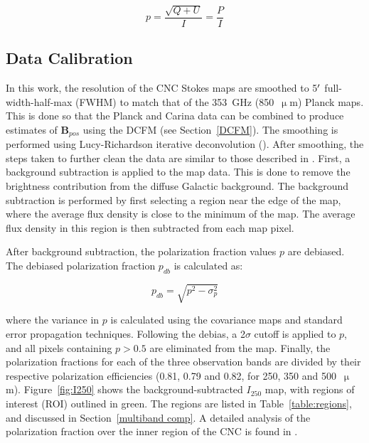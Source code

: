\begin{equation}\label{pol frac}
  p = \frac{\sqrt{Q + U}}{I} = \frac{P}{I}
\end{equation}

\subsection{Data Calibration}\label{data_cal}

In this work, the resolution of the CNC Stokes maps are smoothed to 5$\operatorname{^{\prime}}$ full-width-half-max (FWHM) to match that of the 353~GHz (850~$\upmu$m) Planck maps. This is done so that the Planck and Carina data can be combined to produce estimates of $\boldsymbol{B}_{pos}$ using the DCFM (see Section~\ref{DCFM}). The smoothing is performed using Lucy-Richardson iterative deconvolution (\citet{lucy1974iterative,richardson1972bayesian}). After smoothing, the steps taken to further clean the data are similar to those described in \citet{shariff2015polarimetry}. First, a background subtraction is applied to the map data. This is done to remove the brightness contribution from the diffuse Galactic background. The background subtraction is performed by first selecting a region near the edge of the map, where the average flux density is close to the minimum of the map. The average flux density in this region is then subtracted from each map pixel.

After background subtraction, the polarization fraction values $p$ are debiased. The debiased polarization fraction $p_{db}$ is calculated as:

\begin{equation}
  p_{db} = \sqrt{p^{2} - \sigma_{p}^{2}}
\end{equation}

where the variance in $p$ is calculated using the covariance maps and standard error propagation techniques. Following the debias, a 2$\sigma$ cutoff is applied to $p$, and all pixels containing $p > 0.5$ are eliminated from the map. Finally, the polarization fractions for each of the three observation bands are divided by their respective polarization efficiencies (0.81, 0.79 and 0.82, for 250, 350 and 500~$\upmu$m). Figure~\ref{fig:I250} shows the background-subtracted $I_{250}$ map, with regions of interest (ROI) outlined in green. The regions are listed in Table~\ref{table:regions}, and discussed in Section~\ref{multiband comp}. A detailed analysis of the polarization fraction over the inner region of the CNC is found in \citet{shariff2019submillimeter}.

